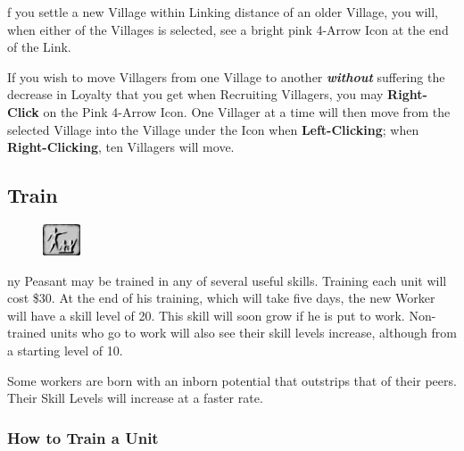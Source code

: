 
f you settle a new Village within Linking distance of an older Village, you will, when either of the Villages is selected, see a bright pink 4-Arrow Icon at the end of the Link.


If you wish to move Villagers from one Village to another \textbf{\textit{without}} suffering the decrease in Loyalty that you get when Recruiting Villagers, you may \textbf{Right-Click} on the Pink 4-Arrow Icon. One Villager at a time will then move from the selected Village into the Village under the Icon when \textbf{Left-Clicking}; when \textbf{Right-Clicking}, ten Villagers will move.

\subsection{Train}


\begin{figure}
    \vspace{-20pt}
    \begin{center}
        \includegraphics[width=0.1\textwidth]{Ttrain}
    \end{center}
    \vspace{-20pt}
\end{figure}


ny Peasant may be trained in any of several useful skills. Training each unit will cost \$30. At the end of his training, which will take five days, the new Worker will have a skill level of 20. This skill will soon grow if he is put to work. Non-trained units who go to work will also see their skill levels increase, although from a starting level of 10.

Some workers are born with an inborn potential that outstrips that of their peers. Their Skill Levels will increase at a faster rate.

\subsubsection{\textsf{How to Train a Unit}}

